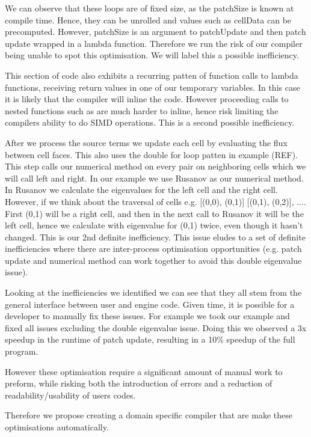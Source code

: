 We can observe that these loops are of fixed size, as the patchSize is known at compile time. 
Hence, they can be unrolled and values such as cellData can be precomputed.   
However, patchSize is an argument to patchUpdate and then patch update wrapped in a lambda function.
Therefore we run the risk of our compiler being unable to spot this optimisation.
We will label this a possible inefficiency.

This section of code also exhibits a recurring patten of function calls to lambda functions, receiving return values in one of our temporary variables.
In this case it is likely that the compiler will inline the code.
However proceeding calls to nested functions such as  are much harder to inline, hence risk limiting the compilers ability to do SIMD operations.    
This is a second possible inefficiency.

After we process the source terms we update each cell by evaluating the flux between cell faces.
This also uses the double for loop patten in example (REF). %
This step calls our numerical method on every pair on neighboring cells which we will call left and right.
In our example we use Rusanov as our numerical method.
In Rusanov we calculate the eigenvalues for the left cell and the right cell.
However, if we think about the traversal of cells e.g. [(0,0), (0,1)] [(0,1), (0,2)], .... First (0,1) will be a right cell, and then in the next call to Rusanov it will be the left cell, hence we calculate with eigenvalue for (0,1) twice, even though it hasn't changed.
This is our 2nd definite inefficiency.
This issue eludes to a set of definite inefficiencies where there are inter-process optimisation opportunities (e.g. patch update and numerical method can work together to avoid this double eigenvalue issue).   


Looking at the inefficiencies we identified we can see that they all stem from the general interface between user and engine code.
Given time, it is possible for a developer to manually fix these issues.
For example we took our example and fixed all issues excluding the double eigenvalue issue.
Doing this we observed a 3x speedup in the runtime of patch update, resulting in a 10\% speedup of the full program.

However these optimisation require a significant amount of manual work to preform, while risking both the introduction of errors and a reduction of readability/usability of users codes.

Therefore we propose creating a domain specific compiler that are make these optimisations automatically.


